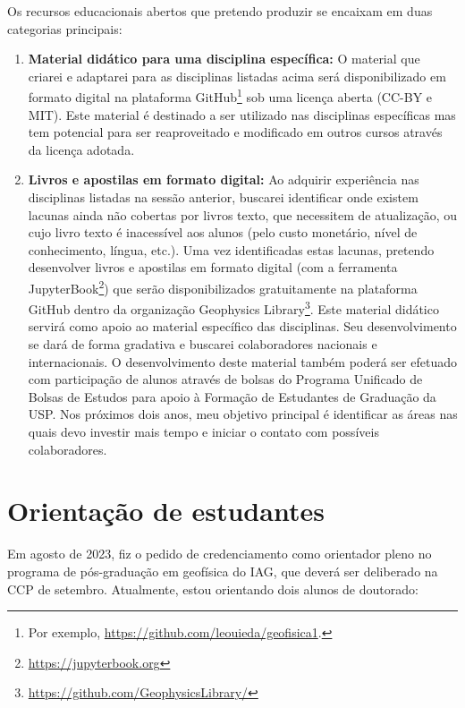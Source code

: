 \documentclass[12pt,a4paper,oneside]{book}
\begin{document}
Os recursos educacionais abertos que pretendo produzir se encaixam em duas
categorias principais:

\begin{enumerate}
  \item \textbf{Material didático para uma disciplina específica:} O material
    que criarei e adaptarei para as disciplinas listadas acima será
    disponibilizado em formato digital na plataforma GitHub\footnote{Por exemplo,
    \url{https://github.com/leouieda/geofisica1}.} sob uma licença aberta (CC-BY
    e MIT). Este material é destinado a ser utilizado nas disciplinas
    específicas mas tem potencial para ser reaproveitado e modificado em outros
    cursos através da licença adotada.
  \item \textbf{Livros e apostilas em formato digital:}
    Ao adquirir experiência nas disciplinas listadas na sessão anterior,
    buscarei identificar onde existem lacunas ainda não cobertas por livros
    texto, que necessitem de atualização, ou cujo livro texto é inacessível aos
    alunos (pelo custo monetário, nível de conhecimento, língua,
    etc.). Uma vez identificadas estas lacunas, pretendo desenvolver livros e
    apostilas em formato digital (com a ferramenta
    JupyterBook\footnote{\url{https://jupyterbook.org}}) que serão
    disponibilizados gratuitamente na plataforma GitHub dentro da organização
    Geophysics Library\footnote{\url{https://github.com/GeophysicsLibrary/}}.
    Este material didático servirá como apoio ao material específico das
    disciplinas. Seu desenvolvimento se dará de forma gradativa e buscarei
    colaboradores nacionais e internacionais.
    O desenvolvimento deste material também poderá ser efetuado com
    participação de alunos através de bolsas do Programa Unificado de Bolsas de
    Estudos para apoio à Formação de Estudantes de Graduação da USP. Nos
    próximos dois anos, meu objetivo principal é identificar as áreas nas quais
    devo investir mais tempo e iniciar o contato com possíveis colaboradores.
\end{enumerate}


\section{Orientação de estudantes}

Em agosto de 2023, fiz o pedido de credenciamento como orientador pleno no
programa de pós-graduação em geofísica do IAG, que deverá ser deliberado
na CCP de setembro.
Atualmente, estou orientando dois alunos de doutorado:
\end{document}
